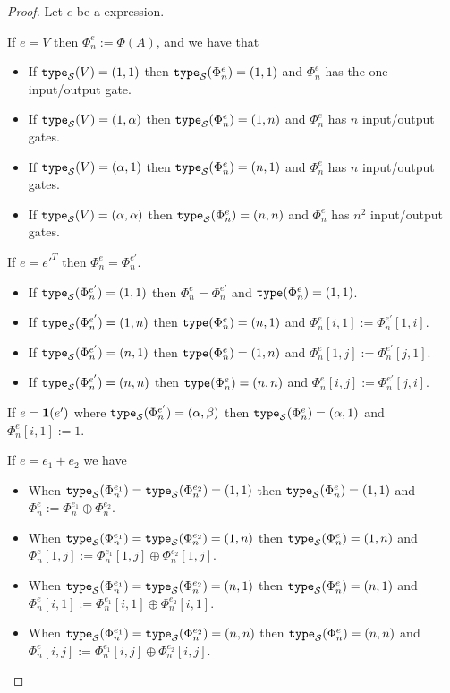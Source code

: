 \begin{proof}

Let $e$ be a \langfor expression. 

If $e=V$ then $\Phi_n^e:=\Phi(A)$, and we have that
\begin{itemize}
	\item If $\texttt{type}_{\mathcal{S}}(V)=(1,1)$ then $\texttt{type}_{\mathcal{S}}(\Phi^e_n)=(1,1)$ and $\Phi^e_n$ has the one input/output gate.
	\item If $\texttt{type}_{\mathcal{S}}(V)=(1,\alpha)$ then $\texttt{type}_{\mathcal{S}}(\Phi^e_n)=(1,n)$ and $\Phi^e_n$ has $n$ input/output gates.
  \item If $\texttt{type}_{\mathcal{S}}(V)=(\alpha,1)$ then $\texttt{type}_{\mathcal{S}}(\Phi^e_n)=(n,1)$ and $\Phi^e_n$ has $n$ input/output gates.
	\item If $\texttt{type}_{\mathcal{S}}(V)=(\alpha,\alpha)$ then $\texttt{type}_{\mathcal{S}}(\Phi^e_n)=(n,n)$ and $\Phi^e_n$ has $n^2$ input/output gates. 
\end{itemize}

If $e=e'^T$ then $\Phi^e_n=\Phi^{e'}_n$. 
\begin{itemize}
	\item If $\texttt{type}_{\mathcal{S}}(\Phi^{e'}_n)=(1, 1)$ then $\Phi^e_n=\Phi^{e'}_n$ and $\texttt{type}(\Phi^e_n)=(1,1)$.
	\item If $\texttt{type}_{\mathcal{S}}(\Phi^{e'}_n)=(1, n)$ then $\texttt{type}(\Phi^e_n)=(n,1)$ and $\Phi^e_n[i,1]:=\Phi^{e'}_n[1,i]$. 
  \item If $\texttt{type}_{\mathcal{S}}(\Phi^{e'}_n)=(n, 1)$ then $\texttt{type}(\Phi^e_n)=(1,n)$ and $\Phi^e_n[1,j]:=\Phi^{e'}_n[j,1]$. 
  \item If $\texttt{type}_{\mathcal{S}}(\Phi^{e'}_n)=(n, n)$ then $\texttt{type}(\Phi^e_n)=(n,n)$ and $\Phi^e_n[i,j]:=\Phi^{e'}_n[j,i]$. 
\end{itemize}

If $e={\mathbf{1}}(e')$ where $\texttt{type}_{\mathcal{S}}(\Phi^{e'}_n)=(\alpha,\beta)$ then $\texttt{type}_{\mathcal{S}}(\Phi^{e}_n)=(\alpha,1)$ and $\Phi^e_n[i,1]:=1$.

If $e=e_1 + e_2$ we have

\begin{itemize}
	\item When $\texttt{type}_{\mathcal{S}}(\Phi^{e_1}_n)=\texttt{type}_{\mathcal{S}}(\Phi^{e_2}_n)=(1, 1)$  then $\texttt{type}_{\mathcal{S}}(\Phi^{e}_n)=(1, 1)$ and $\Phi^e_n:=\Phi^{e_1}_n \oplus \Phi^{e_2}_n$.
  \item When $\texttt{type}_{\mathcal{S}}(\Phi^{e_1}_n)=\texttt{type}_{\mathcal{S}}(\Phi^{e_2}_n)=(1, n)$  then $\texttt{type}_{\mathcal{S}}(\Phi^{e}_n)=(1, n)$ and $\Phi^e_n[1,j]:=\Phi^{e_1}_n[1,j] \oplus \Phi^{e_2}_n[1,j]$.
  \item When $\texttt{type}_{\mathcal{S}}(\Phi^{e_1}_n)=\texttt{type}_{\mathcal{S}}(\Phi^{e_2}_n)=(n, 1)$  then $\texttt{type}_{\mathcal{S}}(\Phi^{e}_n)=(n, 1)$ and $\Phi^e_n[i,1]:=\Phi^{e_1}_n[i,1] \oplus \Phi^{e_2}_n[i,1]$.
  \item When $\texttt{type}_{\mathcal{S}}(\Phi^{e_1}_n)=\texttt{type}_{\mathcal{S}}(\Phi^{e_2}_n)=(n, n)$  then $\texttt{type}_{\mathcal{S}}(\Phi^{e}_n)=(n, n)$ and $\Phi^e_n[i,j]:=\Phi^{e_1}_n[i,j] \oplus \Phi^{e_2}_n[i,j]$.
\end{itemize}


\end{proof}
